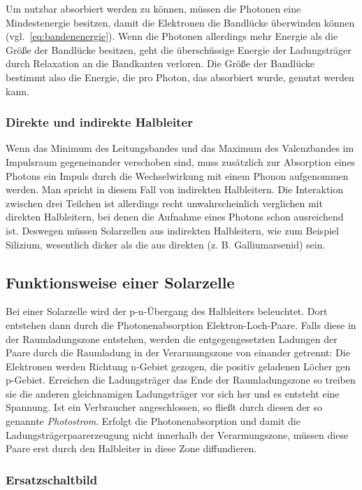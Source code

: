 \documentclass[slug=SZ, room=Hermann-Krone-Bau\,\ Labor\ 1.25, supervisor=Martin\ Kroll]{../../Lab_Report_LaTeX/lab_report}
\begin{document}
Um nutzbar absorbiert werden zu können, müssen die Photonen eine Mindestenergie besitzen, damit die Elektronen
die Bandlücke überwinden können (vgl.~\ref{eq:bandenenergie}). Wenn die Photonen allerdings mehr Energie als
die Größe der Bandlücke besitzen, geht die überschüssige Energie der Ladungsträger durch Relaxation an die
Bandkanten verloren. Die Größe der Bandlücke bestimmt also die Energie, die pro Photon, das absorbiert wurde,
genutzt werden kann.

\subsubsection{Direkte und indirekte Halbleiter}
\label{sec:dirindhalb}

Wenn das Minimum des Leitungsbandes und das Maximum des Valenzbandes im Impulsraum gegeneinander verschoben sind,
muss zusätzlich zur Absorption eines Photons ein Impuls durch die Wechselwirkung mit einem Phonon aufgenommen
werden. Man spricht in diesem Fall von indirekten Halbleitern. Die Interaktion zwischen drei Teilchen ist
allerdings recht unwahrscheinlich verglichen mit direkten Halbleitern, bei denen die Aufnahme eines Photons schon
ausreichend ist.
Deswegen müssen Solarzellen aus indirekten Halbleitern, wie zum Beispiel Silizium, wesentlich dicker als die
aus direkten (z. B. Galliumarsenid) sein.

\subsection{Funktionsweise einer Solarzelle}
\label{sec:solar}

Bei einer Solarzelle wird der p-n-Übergang des Halbleiters beleuchtet. Dort entstehen dann durch
die Photonenabsorption Elektron-Loch-Paare. Falls diese in der Raumladungszone entstehen, werden die 
entgegengesetzten Ladungen der Paare durch die Raumladung in der Verarmungszone von einander getrennt: 
Die Elektronen werden Richtung n-Gebiet gezogen, die positiv geladenen Löcher gen p-Gebiet.
Erreichen die Ladungsträger das Ende der Raumladungszone so treiben sie die anderen gleichnamigen Ladungsträger 
vor sich her und es entsteht eine Spannung. Ist ein Verbraucher angeschlossen, so fließt durch diesen der so genannte \emph{Photostrom}.
Erfolgt die Photonenabsorption und damit die Ladungsträgerpaarerzeugung nicht innerhalb der Verarmungszone,
müssen diese Paare erst durch den Halbleiter in diese Zone diffundieren.

\subsubsection{Ersatzschaltbild}
\label{sec:ersatz}
\end{document}
